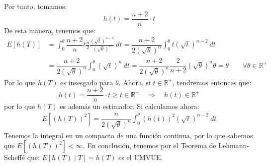 \begin{ejercicio}
    Por tanto, tomamos:
    \begin{equation*}
        h(t) = \dfrac{n+2}{n} \cdot t
    \end{equation*}
    De esta manera, tenemos que:
    \begin{align*}
        E[h(T)] &= \int_{0}^{\theta} \dfrac{n+2}{n}t\frac{n}{2}\frac{{\left(\sqrt{t}\right)}^{n-2}}{{\left(\sqrt{\theta}\right)}^{n}}~dt  = \dfrac{n+2}{2{\left(\sqrt{\theta}\right)}^{n}} \int_{0}^{\theta}t{\left(\sqrt{t}\right)}^{n-2} ~dt  \\
                &= \dfrac{n+2}{2{\left(\sqrt{\theta}\right)}^{n}} \int_{0}^{\theta}{\left(\sqrt{t}\right)}^{n} ~dt   = \dfrac{n+2}{2{\left(\sqrt{\theta}\right)}^{n}} \dfrac{2}{n+2}{\left(\sqrt{\theta}\right)}^{n}\theta  = \theta \qquad \forall \theta\in \mathbb{R}^+
    \end{align*}
    Por lo que $h(T)$ es insesgado para $\theta$. Ahora, si $t\in \mathbb{R}^+$, tendremos entonces que:
    \begin{equation*}
        h(t) = \dfrac{n+2}{n}\cdot t \geq t \in \mathbb{R}^+ \quad  \Longrightarrow \quad  h(t) \in \mathbb{R}^+
    \end{equation*}
    por lo que $h(T)$ es además un estimador. Si calculamos ahora:
    \begin{align*}
        E\left[{(h(T))}^{2}\right] = \dfrac{n}{2{\left(\sqrt{\theta}\right)}^{n}} \int_{0}^{\theta} {(h(t))}^{2}{(\sqrt{t})}^{n-2}~dt 
    \end{align*}
    Tenemos la integral en un compacto de una función continua, por lo que sabemos que $E[{(h(T))}^{2}]<\infty$. En conclusión, tenemos por el Teorema de Lehmann-Scheffé que: $E[h(T)\mid T] = h(T)$ es el UMVUE.
\end{ejercicio}

